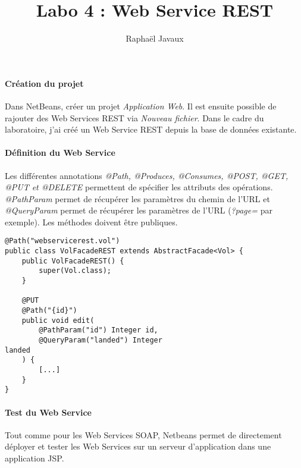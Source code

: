 \documentclass[a4paper,12pt,french]{article}
\title{Labo 4 : Web Service REST}
\author{Raphaël Javaux}
\date{}
\begin{document}
\maketitle 

\paragraph{Création du projet}
Dans NetBeans, créer un projet \textit{Application Web}.
Il est ensuite possible de rajouter des Web Services REST via \textit{Nouveau
fichier}. Dans le cadre du laboratoire, j'ai créé un Web Service REST depuis la
base de données existante.

\paragraph{Définition du Web Service}
Les différentes annotations \textit{@Path, @Produces, @Consumes, @POST,
@GET, @PUT et @DELETE} permettent de spécifier les attributs des opérations.
\textit{@PathParam} permet de récupérer les paramètres du chemin de l'URL
et \textit{@QueryParam} permet de récupérer les paramètres de l'URL
(\textit{?page=} par exemple). Les méthodes doivent être publiques.

\begin{lstlisting}
@Path("webservicerest.vol")
public class VolFacadeREST extends AbstractFacade<Vol> {
    public VolFacadeREST() {
        super(Vol.class);
    }

    @PUT
    @Path("{id}")
    public void edit(
        @PathParam("id") Integer id,
        @QueryParam("landed") Integer
landed
    ) {
        [...]
    }
}
\end{lstlisting}

\paragraph{Test du Web Service}
Tout comme pour les Web Services SOAP, Netbeans permet de directement
déployer et tester les Web Services sur un serveur d'application dans une
application JSP.
\end{document}

